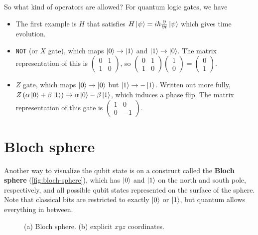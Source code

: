 \documentclass[12pt, english]{book}
\begin{document}
So what kind of operators are allowed?
For quantum logic gates, we have
\begin{itemize}
	\item The first example is $H$ that satisfies $H \ket{\psi} = i \hbar \pdv{t} \ket{\psi}$ which gives time evolution.
	
	\item \texttt{NOT} (or $X$ gate), which maps $\ket{0} \rightarrow \ket{1}$ and $\ket{1} \rightarrow \ket{0}$.
	The matrix representation of this is $\begin{pmatrix} 0 & 1 \\ 1 & 0 \end{pmatrix}$, so $\begin{pmatrix} 0 & 1 \\ 1 & 0 \end{pmatrix} \begin{pmatrix} 1 \\ 0 \end{pmatrix} = \begin{pmatrix} 0 \\ 1 \end{pmatrix}$.
	
	\item $Z$ gate, which maps $\ket{0} \rightarrow \ket{0}$ but $\ket{1} \rightarrow -\ket{1}$.
	Written out more fully, $Z \left( \alpha \ket{0} + \beta \ket{1} \right) \rightarrow \alpha \ket{0} - \beta \ket{1}$, which induces a phase flip. 
	The matrix representation of this gate is $\begin{pmatrix} 1 & 0 \\ 0 & -1 \end{pmatrix}$.
\end{itemize}


\section{Bloch sphere}

Another way to visualize the qubit state is on a construct called the \textbf{Bloch sphere} (\autoref{fig:bloch-sphere}), which has $\ket{0}$ and $\ket{1}$ on the north and south pole, respectively, and all possible qubit states represented on the surface of the sphere.
Note that classical bits are restricted to exactly $\ket{0}$ or $\ket{1}$, but quantum allows everything in between.

\begin{figure}[!ht]
	\centering
	 \hspace{10ex}
	\caption{(a) Bloch sphere. (b) explicit $xyz$ coordinates.}
	\label{fig:bloch-sphere}
\end{figure}
\end{document}
